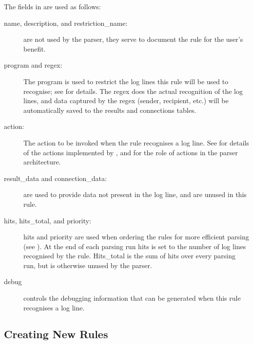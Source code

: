The fields in  are used as
follows:

\begin{description}

    \item [name, description, and restriction\_name:] are not used by the
        parser, they serve to document the rule for the user's benefit.

    \item [program and regex:] The program is used to restrict the log
        lines this rule will be used to recognise; see  for details.  The regex does the
        actual recognition of the log lines, and data captured by the regex
        (sender, recipient, etc.) will be automatically saved to the
        results and connections tables.

    \item [action:] The action to be invoked when the rule recognises a log
        line.  See  for
        details of the actions implemented by \parsername{}, and
         for the role of actions in the
        parser architecture.

    \item [result\_data and connection\_data:] are used to provide data not
        present in the log line, and are unused in this rule.

    \item [hits, hits\_total, and priority:] hits and priority are used
        when ordering the rules for more efficient parsing (see
        ).  At the end of each
        parsing run hits is set to the number of log lines recognised by
        the rule.  Hits\_total is the sum of hits over every parsing run,
        but is otherwise unused by the parser.

    \item [debug] controls the debugging information that can be generated
        when this rule recognises a log line.

\end{description}

\subsection{Creating New Rules}

\label{creating new rules in implementation}

